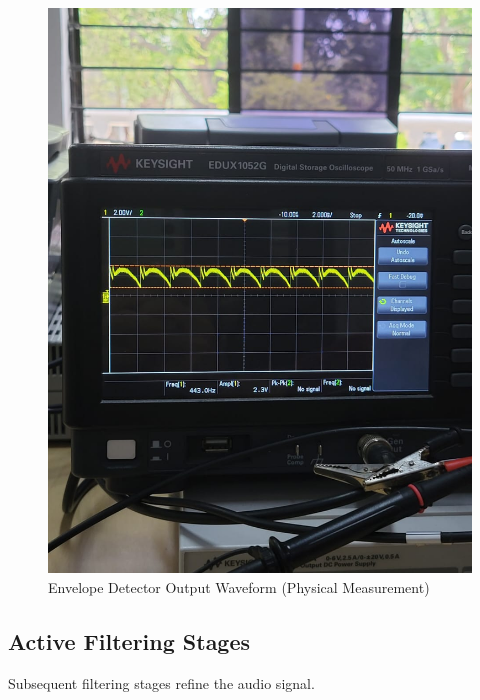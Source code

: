 \documentclass[conference]{IEEEtran}
\begin{document}
\begin{figure}[htbp]
    \centering
    \includegraphics[width=0.3\textheight, keepaspectratio]{envelopeoutput.jpeg} %
    \caption{Envelope Detector Output Waveform (Physical Measurement)}
    \label{fig:envelopeoutput}
\end{figure}

\subsection{Active Filtering Stages}
Subsequent filtering stages refine the audio signal.
\end{document}
